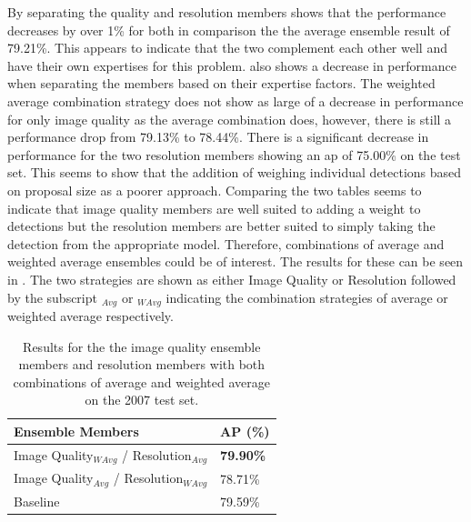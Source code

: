 By separating the quality and resolution members  shows that the performance decreases by over 1\% for both in comparison the the average ensemble result of 79.21\%. This appears to indicate that the two complement each other well and have their own expertises for this problem.  also shows a decrease in performance when separating the members based on their expertise factors. The weighted average combination strategy does not show as large of a decrease in performance for only image quality as the average combination does, however, there is still a performance drop from 79.13\% to 78.44\%. There is a significant decrease in performance for the two resolution members showing an \gls{ap} of 75.00\% on the test set. This seems to show that the addition of weighing individual detections based on proposal size as a poorer approach. Comparing the two tables seems to indicate that image quality members are well suited to adding a weight to detections but the resolution members are better suited to simply taking the detection from the appropriate model. Therefore, combinations of average and weighted average ensembles could be of interest. The results for these can be seen in . The two strategies are shown as either Image Quality or Resolution followed by the subscript $_{Avg}$ or $_{WAvg}$ indicating the combination strategies of average or weighted average respectively. 

\begin{table}[h]
\centering
\caption{Results for the the image quality ensemble members and resolution members with both combinations of average and weighted average on the 2007 test set.}
\label{tab:weandavgres}
\begin{tabular}{|l|l|}
\hline
\textbf{Ensemble Members}                  & \textbf{AP (\%)} \\ \hline
Image Quality$_{WAvg}$ / Resolution$_{Avg}$ & \textbf{79.90\%} \\ \hline
Image Quality$_{Avg}$ / Resolution$_{WAvg}$ & 78.71\% \\ \hline
Baseline                          & 79.59\% \\ \hline
\end{tabular}
\end{table}

